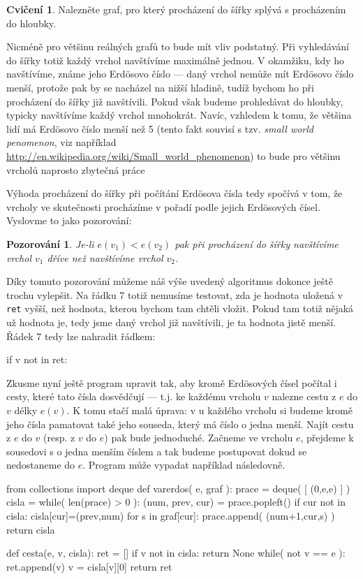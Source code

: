 \documentclass[a4paper,10pt,oneside]{article}
\newtheorem*{observation*}{Pozorování}
\theoremstyle{definition}
\newtheorem{cviceni}[subsection]{Cvičení}
\begin{document}
\begin{cviceni} Nalezněte graf, pro který procházení do šířky splývá s procházením do hloubky.
\end{cviceni}

Nicméně pro většinu reálných grafů to bude mít vliv podstatný. Při vyhledávání do šířky totiž každý vrchol navštívíme maximálně jednou. V okamžiku,
kdy ho navštívíme, známe jeho Erdösovo číslo --- daný vrchol nemůže mít Erdösovo číslo menší, protože pak by se nacházel na nižší hladině, tudíž
bychom ho při procházení do šířky již navštívili. Pokud však budeme prohledávat do hloubky, typicky navštívíme každý vrchol mnohokrát. Navíc, vzhledem
k tomu, že většina lidí má Erdösovo číslo menší než 5 (tento fakt souvisí s tzv. \emph{small world penomenon}, viz například 
\url{http://en.wikipedia.org/wiki/Small_world_phenomenon}) to bude pro většinu vrcholů naprosto zbytečná práce

Výhoda procházení do šířky při počítání Erdösova čísla tedy spočívá v tom, že vrcholy ve skutečnosti procházíme v pořadí podle jejich Erdösových čísel.
Vyslovme to jako pozorování:

\begin{observation*} Je-li $e(v_1) < e(v_2)$ pak při procházení do šířky navštívíme vrchol $v_1$ dříve než navštívíme vrchol $v_2$.
\end{observation*}

Díky tomuto pozorování můžeme náš výše uvedený algoritmus dokonce ještě trochu vylepšit. Na řádku 7 totiž nemusíme testovat, zda je hodnota uložená
v {\tt ret} vyšší, než hodnota, kterou bychom tam chtěli vložit. Pokud tam totiž nějaká už hodnota je, tedy jsme daný vrchol již navštívili, je ta
hodnota jistě menší. Řádek 7 tedy lze nahradit řádkem:
\begin{python}
            if v not in ret: 
\end{python}
Zkusme nyní ještě program upravit tak, aby kromě Erdösových čísel počítal i cesty, které tato čísla dosvědčují --- t.j. ke každému vrcholu $v$ nalezne
cestu z $e$ do $v$ délky $e(v)$. K tomu stačí malá úprava: v u každého vrcholu si budeme kromě jeho čísla pamatovat také jeho souseda, který má číslo
o jedna menší. Najít cestu z $e$ do $v$ (resp. z $v$ do $e$) pak bude jednoduché. Začneme ve vrcholu $e$, přejdeme k sousedovi s o jedna menším číslem 
a tak budeme postupovat dokud se nedostaneme do $e$. Program může vypadat například následovně. 
\begin{python}
 from collections import deque
 def varerdos( e, graf ):
    prace = deque( [ (0,e,e) ] )
    cisla = {}
    while( len(prace) > 0 ):
        (num, prev, cur) = prace.popleft()
        if cur not in cisla:
            cisla[cur]=(prev,num)
            for s in graf[cur]:
                prace.append( (num+1,cur,s) )
    return cisla
 
 def cesta(e, v, cisla):
    ret = []
    if v not in cisla:
        return None
    while( not v == e ):
        ret.append(v)
        v = cisla[v][0]
    return ret
\end{python}
\end{document}
